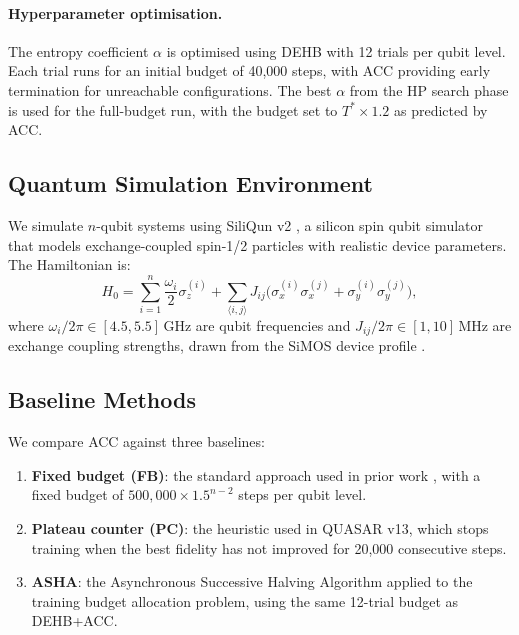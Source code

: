 \paragraph{Hyperparameter optimisation.}
The entropy coefficient $\alpha$ is optimised using DEHB \cite{awad2021dehb}
with 12 trials per qubit level. Each trial runs for an initial budget of 40,000
steps, with ACC providing early termination for unreachable configurations.
The best $\alpha$ from the HP search phase is used for the full-budget run,
with the budget set to $T^* \times 1.2$ as predicted by ACC.

\subsection{Quantum Simulation Environment}

We simulate $n$-qubit systems using SiliQun v2 \cite{TODO_siliqun}, a
silicon spin qubit simulator that models exchange-coupled spin-1/2 particles
with realistic device parameters. The Hamiltonian is:
\begin{equation}
  H_0 = \sum_{i=1}^{n} \frac{\omega_i}{2} \sigma_z^{(i)}
        + \sum_{\langle i,j\rangle} J_{ij} \bigl(\sigma_x^{(i)}\sigma_x^{(j)}
        + \sigma_y^{(i)}\sigma_y^{(j)}\bigr),
\end{equation}
where $\omega_i / 2\pi \in [4.5, 5.5]\,\mathrm{GHz}$ are qubit frequencies and
$J_{ij} / 2\pi \in [1, 10]\,\mathrm{MHz}$ are exchange coupling strengths,
drawn from the SiMOS device profile \cite{TODO_siliqun}.

\subsection{Baseline Methods}

We compare ACC against three baselines:

\begin{enumerate}
  \item \textbf{Fixed budget (FB)}: the standard approach used in prior work
    \cite{yao2021reinforcement,moro2021quantum}, with a fixed budget of
    $500{,}000 \times 1.5^{n-2}$ steps per qubit level.
  \item \textbf{Plateau counter (PC)}: the heuristic used in QUASAR v13,
    which stops training when the best fidelity has not improved for 20,000
    consecutive steps.
  \item \textbf{ASHA}: the Asynchronous Successive Halving Algorithm
    \cite{li2020system} applied to the training budget allocation problem,
    using the same 12-trial budget as DEHB+ACC.
\end{enumerate}

